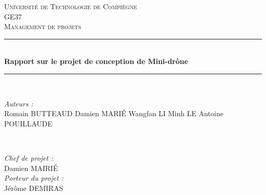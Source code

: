 \documentclass[a4paper, 12pt, leqno]{report}
\theoremstyle{plain}
\begin{document}
\begin{titlepage}

\newcommand{\HRule}{\rule{\linewidth}{0.5mm}} %

\center %
 

\textsc{\LARGE Université de Technologie de Compiègne}\\[1.5cm] %
\textsc{\Large GE37}\\[0.5cm] %
\textsc{\large Management de projets}\\[0.5cm] %


\HRule \\[0.4cm]
{ \huge \bfseries Rapport sur le projet de conception de Mini-drône}\\[0.4cm] %
\HRule \\[1.5cm]
 

\begin{minipage}{0.4\textwidth}
\begin{flushleft} \large
\emph{Auteurs :}\\
Romain \textsc{BUTTEAUD} %
Damien \textsc{MARIÉ} 
Wangfan \textsc{LI} 
Minh \textsc{LE} 
Antoine \textsc{POUILLAUDE} 
\end{flushleft}
\end{minipage}
~
\begin{minipage}{0.4\textwidth}
\begin{flushright} \large
\emph{Chef de projet :} \\
Damien \textsc{MAIRIÉ} \\%
\emph{Porteur du projet :} \\
Jérôme \textsc{DEMIRAS} %
\end{flushright}
\end{minipage}\\[4cm]


\end{titlepage}
\end{document}
